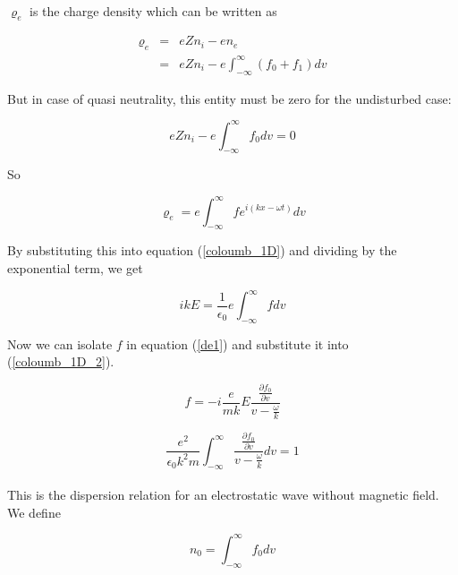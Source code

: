 \documentclass[a4paper,10pt]{report}
\begin{document}
\paragraph*{}
$\varrho_e$ is the charge density which can be written as

\begin{eqnarray}
  \varrho_e &=& eZn_i -en_e \\
 &=& eZn_i-e \int^{\infty}_{-\infty }{(f_0+f_1)dv}
 \end{eqnarray}

But in case of quasi neutrality, this entity must be zero for the undisturbed case:

\begin{equation}
    eZn_i-e \int^{\infty}_{-\infty }{f_0 dv}=0
\end{equation}

So

\begin{equation}
    \varrho_e = e \int^{\infty}_{-\infty }{f e^{i(kx-\omega t)} dv}
\end{equation}

By substituting this into equation (\ref{coloumb_1D}) and dividing by the exponential term, we get

\begin{equation}\label{coloumb_1D_2}
    i k E = \frac{1}{\epsilon_0} e \int^{\infty}_{-\infty } {f  dv}
\end{equation}

Now we can isolate $f$ in equation (\ref{de1}) and substitute it into (\ref{coloumb_1D_2}).

\begin{equation}
       f = -i\frac{e}{m k} E \frac{\frac{\partial f_0}{\partial v}}{v-\frac{\omega}{k}}
\end{equation}

\begin{equation}\label{dispersion_relation}
 \frac{e^2}{\epsilon_0 k^2 m}  \int^{\infty}_{-\infty }{  \frac{\frac{\partial f_0}{\partial v}}{v-\frac{\omega}{k}} dv} =1
\end{equation}

\paragraph*{}
This is the dispersion relation for an electrostatic wave without magnetic field. We define

\begin{equation}
    n_0= \int^{\infty}_{-\infty }{f_0 dv}
\end{equation}
\end{document}
